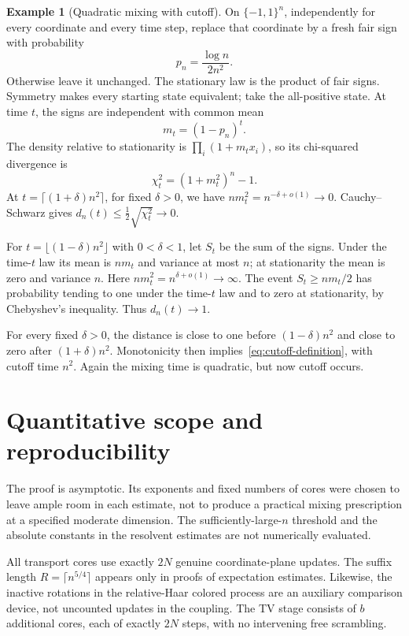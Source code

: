 \documentclass[11pt]{article}
\theoremstyle{definition}\newtheorem{definition}[theorem]{Definition}
\newtheorem{example}[theorem]{Example}
\theoremstyle{remark}\newtheorem{remark}[theorem]{Remark}
\begin{document}
\begin{example}[Quadratic mixing with cutoff]\label{ex:with-cutoff}
On $\{-1,1\}^n$, independently for every coordinate and every time step, replace that coordinate by a fresh fair sign with probability
\[
 p_n=\frac{\log n}{2n^2}.
\]
Otherwise leave it unchanged. The stationary law is the product of fair signs. Symmetry makes every starting state equivalent; take the all-positive state. At time $t$, the signs are independent with common mean
\[
 m_t=(1-p_n)^t.
\]
The density relative to stationarity is $\prod_i(1+m_tx_i)$, so its chi-squared divergence is
\[
 \chi^2_t=(1+m_t^2)^n-1.
\]
At $t=\lceil(1+\delta)n^2\rceil$, for fixed $\delta>0$, we have
$nm_t^2=n^{-\delta+o(1)}\to0$. Cauchy--Schwarz gives
$d_n(t)\le\tfrac12\sqrt{\chi^2_t}\to0$.

For $t=\lfloor(1-\delta)n^2\rfloor$ with $0<\delta<1$, let $S_t$ be the sum of the signs. Under the time-$t$ law its mean is $nm_t$ and variance at most $n$; at stationarity the mean is zero and variance $n$. Here $nm_t^2=n^{\delta+o(1)}\to\infty$. The event $S_t\ge nm_t/2$ has probability tending to one under the time-$t$ law and to zero at stationarity, by Chebyshev's inequality. Thus $d_n(t)\to1$.

For every fixed $\delta>0$, the distance is close to one before $(1-\delta)n^2$ and close to zero after $(1+\delta)n^2$. Monotonicity then implies~\eqref{eq:cutoff-definition}, with cutoff time $n^2$. Again the mixing time is quadratic, but now cutoff occurs.
\end{example}

\section{Quantitative scope and reproducibility}\label{sec:scope-final}
The proof is asymptotic. Its exponents and fixed numbers of cores were chosen to leave ample room in each estimate, not to produce a practical mixing prescription at a specified moderate dimension. The sufficiently-large-$n$ threshold and the absolute constants in the resolvent estimates are not numerically evaluated.

All transport cores use exactly $2N$ genuine coordinate-plane updates. The suffix length $R=\lceil n^{5/4}\rceil$ appears only in proofs of expectation estimates. Likewise, the inactive rotations in the relative-Haar colored process are an auxiliary comparison device, not uncounted updates in the coupling. The TV stage consists of $b$ additional cores, each of exactly $2N$ steps, with no intervening free scrambling.
\end{document}
